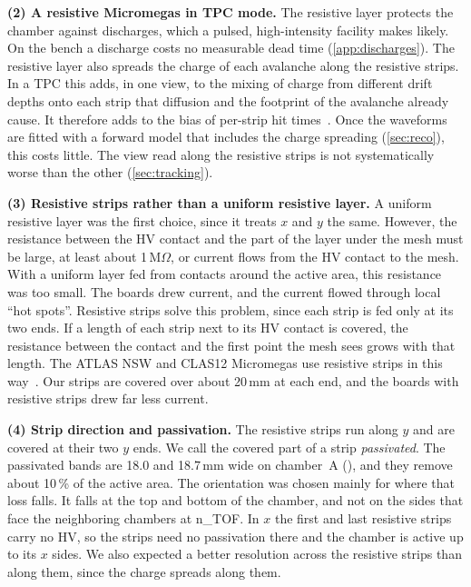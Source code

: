 \textbf{(2) A resistive Micromegas in TPC mode.} The resistive layer protects the chamber against discharges, which a
pulsed, high-intensity facility makes likely. On the bench a discharge costs no measurable dead time
(\cref{app:discharges}). The resistive layer also spreads the charge of each avalanche along the resistive strips. In a
TPC this adds, in one view, to the mixing of charge from different drift depths onto each strip that diffusion and the
footprint of the avalanche already cause. It therefore adds to the bias of per-strip hit times~\cite{paperIIb}. Once
the waveforms are fitted with a forward model that includes the charge spreading (\cref{sec:reco}), this costs little.
The view read along the resistive strips is not systematically worse than the other (\cref{sec:tracking}).

\textbf{(3) Resistive strips rather than a uniform resistive layer.} A uniform resistive layer was the first choice,
since it treats $x$ and $y$ the same. However, the resistance between the HV contact and the part of the layer under
the mesh must be large, at least about 1\,M$\Omega$, or current flows from the HV contact to the mesh. With a uniform
layer fed from contacts around the active area, this resistance was too small. The boards drew current, and the
current flowed through local ``hot spots''. Resistive strips solve this problem, since each strip is fed only at its
two ends. If a length of each strip next to its HV contact is covered, the resistance between the contact and the
first point the mesh sees grows with that length. The ATLAS NSW and CLAS12 Micromegas use resistive strips in this
way~\cite{Alexopoulos2011,Acker2020MVT}. Our strips are covered over about 20\,mm at each end, and the boards with
resistive strips drew far less current.

\textbf{(4) Strip direction and passivation.} The resistive strips run along $y$ and are covered at their two $y$ ends.
We call the covered part of a strip \emph{passivated}. The passivated bands are 18.0 and 18.7\,mm wide on chamber~A
(), and they remove about 10\,\% of the active area. The orientation was chosen mainly for where
that loss falls. It falls at the top and bottom of the chamber, and not on the sides that face the neighboring
chambers at n\_TOF. In $x$ the first and last resistive strips carry no HV, so the strips need no passivation there and
the chamber is active up to its $x$ sides. We also expected a better resolution across the resistive strips than along
them, since the charge spreads along them.

